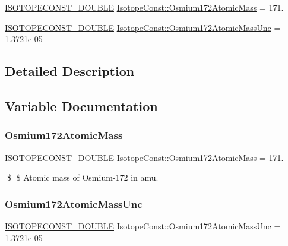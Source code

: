 \begin{DoxyCompactItemize}
\item 
\mbox{\hyperlink{group___isotope_const-_macros_ga8f45a7272ce02c0b4c65c44636ed719a}{I\+S\+O\+T\+O\+P\+E\+C\+O\+N\+S\+T\+\_\+\+D\+O\+U\+B\+LE}} \mbox{\hyperlink{group___isotope_const-_osmium-_os172_gab91635e66261d0a7a4d9bf34e9aa1e50}{Isotope\+Const\+::\+Osmium172\+Atomic\+Mass}} = 171.
\item 
\mbox{\hyperlink{group___isotope_const-_macros_ga8f45a7272ce02c0b4c65c44636ed719a}{I\+S\+O\+T\+O\+P\+E\+C\+O\+N\+S\+T\+\_\+\+D\+O\+U\+B\+LE}} \mbox{\hyperlink{group___isotope_const-_osmium-_os172_ga0bb137f7c5ffca02357854bde4d92a10}{Isotope\+Const\+::\+Osmium172\+Atomic\+Mass\+Unc}} = 1.\+3721e-\/05
\end{DoxyCompactItemize}


\subsection{Detailed Description}


\subsection{Variable Documentation}
\mbox{\label{group___isotope_const-_osmium-_os172_gab91635e66261d0a7a4d9bf34e9aa1e50}} 
\subsubsection{\texorpdfstring{Osmium172\+Atomic\+Mass}{Osmium172AtomicMass}}
{\footnotesize\ttfamily \mbox{\hyperlink{group___isotope_const-_macros_ga8f45a7272ce02c0b4c65c44636ed719a}{I\+S\+O\+T\+O\+P\+E\+C\+O\+N\+S\+T\+\_\+\+D\+O\+U\+B\+LE}} Isotope\+Const\+::\+Osmium172\+Atomic\+Mass = 171.}

\$ \$ Atomic mass of Osmium-\/172 in amu. \mbox{\label{group___isotope_const-_osmium-_os172_ga0bb137f7c5ffca02357854bde4d92a10}} 
\subsubsection{\texorpdfstring{Osmium172\+Atomic\+Mass\+Unc}{Osmium172AtomicMassUnc}}
{\footnotesize\ttfamily \mbox{\hyperlink{group___isotope_const-_macros_ga8f45a7272ce02c0b4c65c44636ed719a}{I\+S\+O\+T\+O\+P\+E\+C\+O\+N\+S\+T\+\_\+\+D\+O\+U\+B\+LE}} Isotope\+Const\+::\+Osmium172\+Atomic\+Mass\+Unc = 1.\+3721e-\/05}

